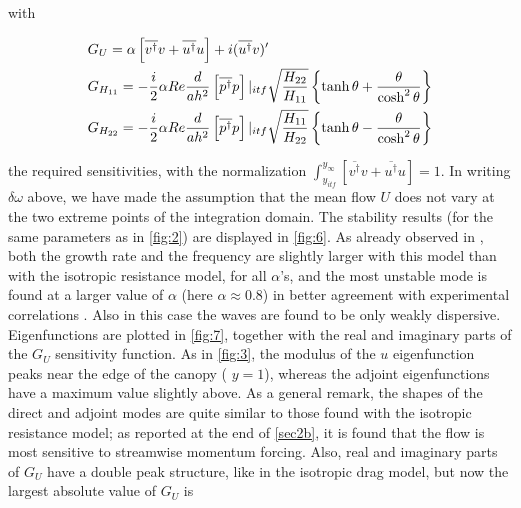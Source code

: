 with

\begin{equation}
\begin{split}
& G_U = \alpha  \left[  \overline{v^{\dagger}} v +  \overline{u^{\dagger}} u \right] + i ( \overline{u^{\dagger}} v)'  \vspace{0.3cm}\\
& G_{{H}_{11}} = -\dfrac{i}{2} \alpha Re \dfrac{d}{a h^2}  \left[  \overline{p^{\dagger}} p \right]|_{itf} \sqrt{\dfrac{{H}_{22}}{{H}_{11}}} \left\lbrace \tanh \theta + \dfrac{\theta}{\cosh^2 \theta}\right\rbrace	\vspace{0.3cm}\\
& G_{ {H}_{22}} = -\dfrac{i}{2} \alpha Re \dfrac{d}{a h^2}  \left[  \overline{p^{\dagger}} p \right]|_{itf} \sqrt{\dfrac{ {H}_{11}}{ {H}_{22}}} \left\lbrace \tanh \theta - \dfrac{\theta}{\cosh^2 \theta}\right\rbrace
\end{split}
\end{equation}


the required sensitivities, with the normalization  $\int_{y_{itf}}^{y_{\infty}} \left[  \overline{v^{\dagger}} v +  \overline{u^{\dagger}} u \right] = 1$.
In writing $\delta \omega$ above, we have made the assumption that the mean flow $U$ does not vary at the two extreme points of the
integration domain.
The stability results (for the same parameters as in \ref{fig:2}) are displayed in \ref{fig:6}. As already
observed in \citet{zampogna2016instability}, both the growth rate and the frequency are slightly larger with this model than
with the isotropic resistance model, for all $\alpha$’s, and the most unstable mode is found at a larger
value of $\alpha$ (here $\alpha \approx 0.8$) in better agreement with experimental correlations \citet{zampogna2016instability} \citet{raupach1996coherent}.  Also in this case the
waves are found to be only weakly dispersive.
Eigenfunctions are plotted in \ref{fig:7}, together with the real and imaginary parts of the $G_U$
sensitivity function. As in \ref{fig:3}, the modulus of the $u$ eigenfunction peaks near the edge of the
canopy ( $y = 1$), whereas the adjoint eigenfunctions have a maximum value slightly above. As a
general remark, the shapes of the direct and adjoint modes are quite similar to those found with
the isotropic resistance model; as reported at the end of \ref{sec2b}, it is found that the flow
is most sensitive to streamwise momentum forcing. Also, real and imaginary parts of $G_U$ have a
double peak structure, like in the isotropic drag model, but now the largest absolute value of $G_U$ is

